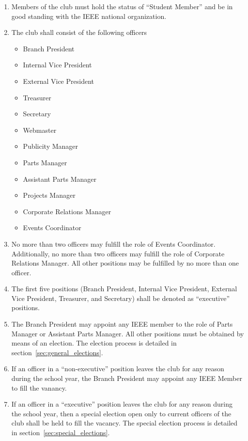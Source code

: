 \documentclass{article}
\begin{document}
\begin{enumerate}
\item Members of the club must hold the status of ``Student Member'' and be in good standing with the IEEE national organization.
\item The club shall consist of the following officers
  \begin{itemize}
    \item Branch President
    \item Internal Vice President
    \item External Vice President
    \item Treasurer
    \item Secretary
    \item Webmaster
    \item Publicity Manager
    \item Parts Manager 
    \item Assistant Parts Manager
    \item Projects Manager
    \item Corporate Relations Manager
    \item Events Coordinator
  \end{itemize}
\item No more than two officers may fulfill the role of Events Coordinator. Additionally, no more than two officers may fulfill the role of Corporate Relations Manager. All other positions may be fulfilled by no more than one officer.
\item The first five positions (Branch President, Internal Vice President, External Vice President, Treasurer, and Secretary) shall be denoted as ``executive'' positions. 
\item The Branch President may appoint any IEEE member to the role of Parts Manager or Assistant Parts Manager. All other positions must be obtained by means of an election. The election process is detailed in section~\ref{sec:general_elections}.
\item If an officer in a ``non-executive'' position leaves the club for any reason during the school year, the Branch President may appoint any IEEE Member to fill the vanancy.
\item If an officer in a ``executive'' position leaves the club for any reason during the school year, then a special election open only to current officers of the club shall be held to fill the vacancy. The special election process is detailed in section~\ref{sec:special_elections}.
\end{enumerate}
\end{document}
